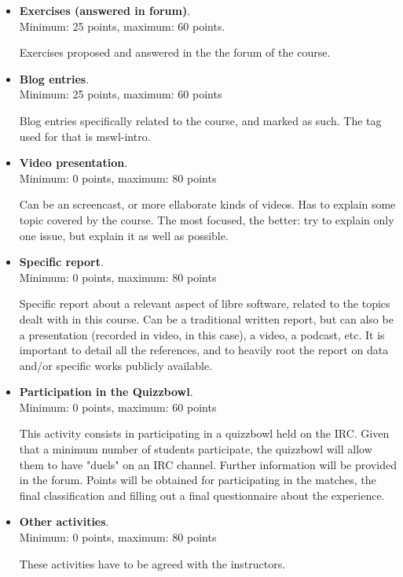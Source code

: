\documentclass[a4paper]{article}
\begin{document}
\begin{itemize}
 \item \textbf{Exercises (answered in forum)}. \\
   Minimum: 25 points, maximum: 60 points.

   Exercises proposed and answered in the the forum of the course.

 \item \textbf{Blog entries}. \\
   Minimum: 25 points, maximum: 60 points

   Blog entries specifically related to the course, and marked as such. The tag used for that is mswl-intro.



 \item \textbf{Video presentation}. \\
   Minimum: 0 points, maximum: 80 points

   Can be an screencast, or more ellaborate kinds of videos. Has to explain some topic covered by the course. The most focused, the better: try to explain only one issue, but explain it as well as possible.

 \item \textbf{Specific report}. \\
   Minimum: 0 points, maximum: 80 points

   Specific report about a relevant aspect of libre software, related to the topics dealt with in this course. Can be a traditional written report, but can also be a presentation (recorded in video, in this case), a video, a podcast, etc. It is important to detail all the references, and to heavily root the report on data and/or specific works publicly available.

 \item \textbf{Participation in the Quizzbowl}. \\
   Minimum: 0 points, maximum: 60 points

  This activity consists in participating in a quizzbowl held on the IRC. Given that a minimum number of students participate, the quizzbowl will allow them to have "duels" on an IRC channel. Further information will be provided in the forum. Points will be obtained for participating in the matches, the final classification and filling out a final questionnaire about the experience.

 \item \textbf{Other activities}. \\
   Minimum: 0 points, maximum: 80 points

   These activities have to be agreed with the instructors.

 \end{itemize}
\end{document}
